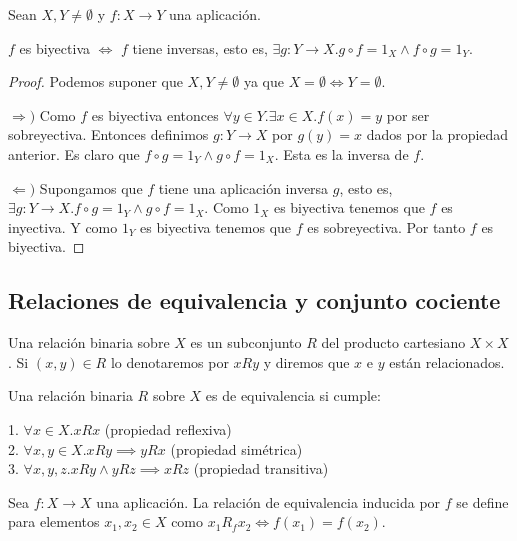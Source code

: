 \begin{theorem}
	Sean $X,Y \neq \emptyset$ y $f:X \to Y$ una aplicación. 
	
	$f$ es biyectiva $\iff$ $f$ tiene inversas, esto es, $\exists g:Y \to X.g \circ f = 1_X \land f \circ g = 1_Y$. 
\end{theorem}
\begin{proof}
Podemos suponer que $X,Y \neq \emptyset$ ya que $X = \emptyset \iff Y = \emptyset$. 

$\Rightarrow)$ Como $f$ es biyectiva entonces $\forall y \in Y. \exists x \in X. f(x) = y$ por ser sobreyectiva. Entonces definimos $g:Y \to X$ por $g(y) = x$ dados por la propiedad anterior. Es claro que $f \circ g = 1_Y \land g \circ f = 1_X$. Esta es la inversa de $f$. 

$\Leftarrow)$ Supongamos que $f$ tiene una aplicación inversa $g$, esto es, $\exists g:Y \to X. f \circ g = 1_Y \land g \circ f = 1_X$. Como $1_X$ es biyectiva tenemos que $f$ es inyectiva. Y como $1_Y$ es biyectiva tenemos que $f$ es sobreyectiva. Por tanto $f$ es biyectiva. 
\end{proof}

\subsection{Relaciones de equivalencia y conjunto cociente}

\begin{definition}
	Una relación binaria sobre $X$ es un subconjunto $R$ del producto cartesiano $X \times X$. Si $(x,y) \in R$ lo denotaremos por $xRy$ y diremos que $x$ e $y$ están relacionados. 
\end{definition}

\begin{definition}
	Una relación binaria $R$ sobre $X$ es de equivalencia si cumple:
	
	1. $\forall x \in X. xRx$ (propiedad reflexiva)\\
	2. $\forall x,y \in X. xRy \implies yRx$ (propiedad simétrica) \\
	3. $\forall x,y,z. xRy \land yRz \implies xRz$ (propiedad transitiva)
\end{definition}

\begin{example}
	Sea $f:X \to X$ una aplicación. La relación de equivalencia inducida por $f$ se define para elementos $x_1,x_2 \in X$ como $x_1R_fx_2 \iff f(x_1) = f(x_2)$.
\end{example}



